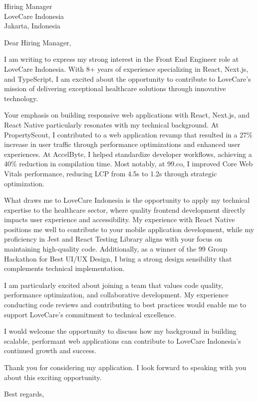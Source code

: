 \documentclass[11pt,a4paper]{letter}
\begin{document}
\begin{letter}{%
    Hiring Manager \\
    LoveCare Indonesia \\
    Jakarta, Indonesia
}

\opening{Dear Hiring Manager,}

I am writing to express my strong interest in the Front End Engineer role at LoveCare Indonesia. With 8+ years of experience specializing in React, Next.js, and TypeScript, I am excited about the opportunity to contribute to LoveCare's mission of delivering exceptional healthcare solutions through innovative technology.

\vspace{10pt}

Your emphasis on building responsive web applications with React, Next.js, and React Native particularly resonates with my technical background. At PropertyScout, I contributed to a web application revamp that resulted in a 27\% increase in user traffic through performance optimizations and enhanced user experiences. At AccelByte, I helped standardize developer workflows, achieving a 40\% reduction in compilation time. Most notably, at 99.co, I improved Core Web Vitals performance, reducing LCP from 4.5s to 1.2s through strategic optimization.

\vspace{10pt}

What draws me to LoveCare Indonesia is the opportunity to apply my technical expertise to the healthcare sector, where quality frontend development directly impacts user experience and accessibility. My experience with React Native positions me well to contribute to your mobile application development, while my proficiency in Jest and React Testing Library aligns with your focus on maintaining high-quality code. Additionally, as a winner of the 99 Group Hackathon for Best UI/UX Design, I bring a strong design sensibility that complements technical implementation.

\vspace{10pt}

I am particularly excited about joining a team that values code quality, performance optimization, and collaborative development. My experience conducting code reviews and contributing to best practices would enable me to support LoveCare's commitment to technical excellence.

\vspace{10pt}

I would welcome the opportunity to discuss how my background in building scalable, performant web applications can contribute to LoveCare Indonesia's continued growth and success.

\vspace{10pt}

Thank you for considering my application. I look forward to speaking with you about this exciting opportunity.

\closing{Best regards,}

\end{letter}
\end{document}
